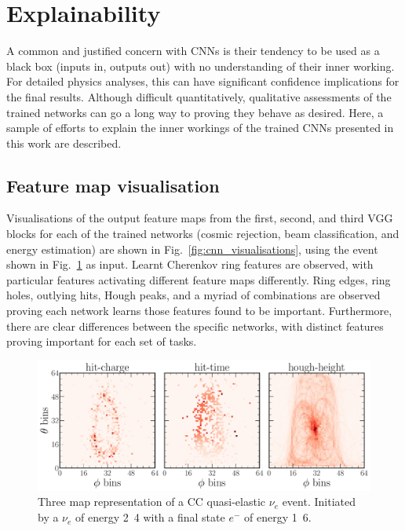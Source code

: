 \section{Explainability} %
\label{sec:results_explain} %

A common and justified concern with CNNs is their tendency to be used as a black box (inputs in,
outputs out) with no understanding of their inner working. For detailed physics analyses, this can
have significant confidence implications for the final results. Although difficult quantitatively,
qualitative assessments of the trained networks can go a long way to proving they behave as
desired. Here, a sample of efforts to explain the inner workings of the trained CNNs presented in
this work are described.

\subsection{Feature map visualisation} %
\label{sec:results_explain_vis} %

Visualisations of the output feature maps from the first, second, and third VGG blocks for each of
the trained networks (cosmic rejection, beam classification, and energy estimation) are shown in
Fig.~\ref{fig:cnn_visualisations}, using the event shown in Fig.~\ref{fig:explain_example_event}
as input. Learnt Cherenkov ring features are observed, with particular features activating
different feature maps differently. Ring edges, ring holes, outlying hits, Hough peaks, and a
myriad of combinations are observed proving each network learns those features found to be
important. Furthermore, there are clear differences between the specific networks, with distinct
features proving important for each set of tasks.

\begin{figure} %
    \includegraphics[width=\textwidth]{diagrams/7-results/explain_example_event.pdf}
    \caption[Example CC quasi-elastic $\nu_{e}$ event for explainability]
    {Three map representation of a CC quasi-elastic $\nu_{e}$ event. Initiated by a $\nu_{e}$ of
        energy \unit{2.4}{\GeV} with a final state $e^{-}$ of energy \unit{1.6}{\GeV}.}
    \label{fig:explain_example_event}
\end{figure}

